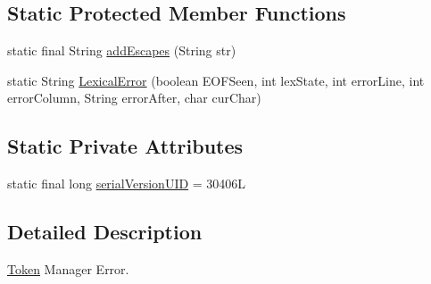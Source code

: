 \subsection*{Static Protected Member Functions}
\begin{DoxyCompactItemize}
\item 
static final String \hyperlink{classde_1_1uulm_1_1ecs_1_1ai_1_1owlapi_1_1krssparser_1_1_token_mgr_error_aa0dd522057502a586eeb922c2a191405}{add\-Escapes} (String str)
\item 
static String \hyperlink{classde_1_1uulm_1_1ecs_1_1ai_1_1owlapi_1_1krssparser_1_1_token_mgr_error_a5c375287ba3cbc10f6933352da4ab2b5}{Lexical\-Error} (boolean E\-O\-F\-Seen, int lex\-State, int error\-Line, int error\-Column, String error\-After, char cur\-Char)
\end{DoxyCompactItemize}
\subsection*{Static Private Attributes}
\begin{DoxyCompactItemize}
\item 
static final long \hyperlink{classde_1_1uulm_1_1ecs_1_1ai_1_1owlapi_1_1krssparser_1_1_token_mgr_error_a28b1f17069dda4e21f95314be4a0d971}{serial\-Version\-U\-I\-D} = 30406\-L
\end{DoxyCompactItemize}


\subsection{Detailed Description}
\hyperlink{classde_1_1uulm_1_1ecs_1_1ai_1_1owlapi_1_1krssparser_1_1_token}{Token} Manager Error. 

